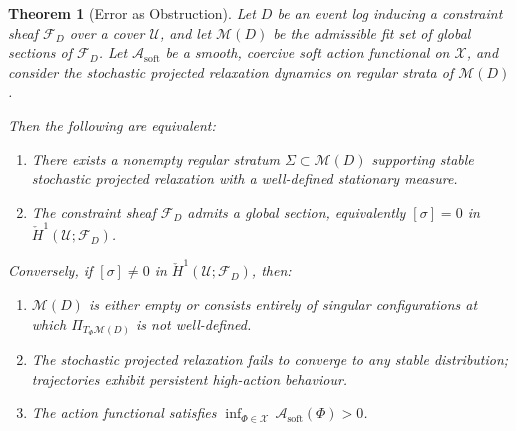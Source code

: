 \documentclass[12pt,oneside]{article}
\theoremstyle{plain}
\newtheorem{theorem}{Theorem}[section]
\theoremstyle{definition}
\theoremstyle{remark}
\newcommand{\X}{\mathcal{X}}
\newcommand{\M}{\mathcal{M}}
\newcommand{\Sh}{\mathcal{F}}
\newcommand{\D}{D}
\newcommand{\Hcheck}{\check{H}}
\newcommand{\Sig}{\Sigma}
\newcommand{\Asoft}{\mathcal{A}_{\mathrm{soft}}}
\begin{document}
\begin{theorem}[Error as Obstruction]
\label{thm:main}
Let $\D$ be an event log inducing a constraint sheaf $\Sh_\D$ over a cover
$\mathcal{U}$, and let $\M(\D)$ be the admissible fit set of global sections of
$\Sh_\D$. Let $\Asoft$ be a smooth, coercive soft action functional on $\X$, and
consider the stochastic projected relaxation dynamics on regular strata of
$\M(\D)$.

Then the following are equivalent:
\begin{enumerate}[label=(\roman*)]
  \item There exists a nonempty regular stratum $\Sig \subset \M(\D)$ supporting
        stable stochastic projected relaxation with a well-defined stationary
        measure.
  \item The constraint sheaf $\Sh_\D$ admits a global section, equivalently
        $[\sigma] = 0$ in $\Hcheck^1(\mathcal{U};\Sh_\D)$.
\end{enumerate}

Conversely, if $[\sigma] \neq 0$ in $\Hcheck^1(\mathcal{U};\Sh_\D)$, then:
\begin{enumerate}[label=(\alph*)]
  \item $\M(\D)$ is either empty or consists entirely of singular configurations
        at which $\Pi_{T_\Phi\M(\D)}$ is not well-defined.
  \item The stochastic projected relaxation fails to converge to any stable
        distribution; trajectories exhibit persistent high-action behaviour.
  \item The action functional satisfies
        $\displaystyle\inf_{\Phi \in \X}\,\Asoft(\Phi) > 0$.
\end{enumerate}
\end{theorem}
\end{document}
